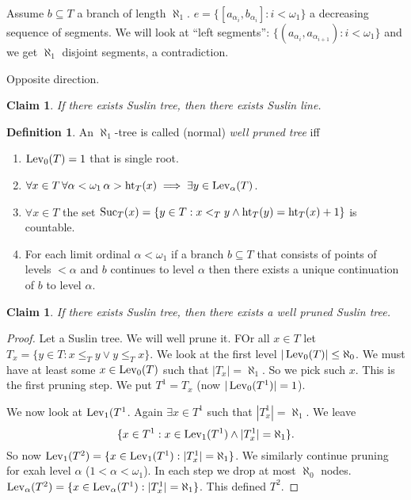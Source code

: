 \documentclass[11pt,pdftex,twoside,a4paper]{article}
\newcommand{\Lev}{\ensuremath{\mathop{\rm Lev}\nolimits}}
\newcommand{\Suc}{\ensuremath{\mathop{\rm Suc}\nolimits}}
\newcommand{\tht}{\ensuremath{\mathop{\rm ht}\nolimits}}
\newtheorem{claim}[thm]{Claim}
\theoremstyle{definition}
\newtheorem{ldef}[thm]{Definition}
\begin{document}
{Assume \(b\subseteq T\) a branch of length \(\aleph_1\).
\(e=\{[a_{\alpha_i},b_{\alpha_i}]: i < \omega_1\}\)
a decreasing sequence of segments. We will look at ``left segments'':
\(\{(a_{\alpha_i},a_{\alpha_{i+1}}): i < \omega_1\}\)
and we get \(\aleph_1\) disjoint segments, a contradiction.

Opposite direction. 
\begin{claim} \label{claim:suslin:tree:line}
If there exists Suslin tree, then there exists Suslin line.
\end{claim}
\begin{ldef}
An \(\aleph_1\)-tree  is called (normal) 
\emph{well pruned tree} iff
\begin{enumerate}
\item \(\Lev_0(T)=1\) that is single root.
\item \(\forall x\in T\,\forall \alpha<\omega_1\, 
 \alpha > \tht_T(x) \implies \exists y\in\Lev_\alpha(T)\).
\item \(\forall x\in T\) the set 
  \(\Suc_T(x) = \{y\in T: x<_T y \land \tht_T(y)=\tht_T(x)+1\}\)
  is countable.
\item For each limit ordinal \(\alpha<\omega_1\) if a branch \(b\subseteq T\)
that consists of points of levels \(< \alpha\) and $b$ continues
to level \(\alpha\) then there exists a unique continuation 
of $b$ to level \(\alpha\).
\end{enumerate}
\end{ldef}
\begin{claim}
If there exists Suslin tree, then there exists a well pruned Suslin tree.
\end{claim}
\begin{proof}
Let  a Suslin tree. We will well prune it.
FOr all \(x\in T\) let \(T_x = \{y\in T: x\leq_T y \lor y\leq_T x\}\).
We look at the first level \(|\Lev_0(T)|\leq \aleph_0\).
We must have at least some \(x\in \Lev_0(T)\) such that \(|T_x| = \aleph_1\).
So we pick such $x$. This is the first pruning step.
We  put \(T^1 = T_x\) (now \(|\Lev_0(T^1)|=1\)).

We now look at \(\Lev_1(T^1\). Again \(\exists x\in T^1\) 
such that \(|T^1_x| = \aleph_1\).
We leave 
\begin{equation*}
\{x\in T^1: x\in \Lev_1(T^1) \land |T^1_x| = \aleph_1\}.
\end{equation*}
So now \(\Lev_1(T^2) = \{x\in\Lev_1(T^1): |T^1_x| = \aleph_1\}\).
We similarly continue pruning for exah level \(\alpha\) (\(1<\alpha<\omega_1\)).
In each step we drop at most \(\aleph_0\) nodes.
\(\Lev_\alpha(T^2) = \{x\in \Lev_\alpha(T^1): |T^1_x| = \aleph_1\}\).
This defined \(T^2\).


\end{proof}}
\end{document}

